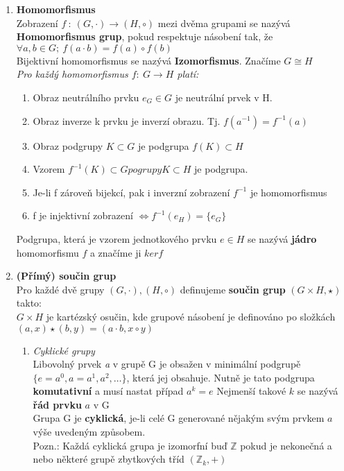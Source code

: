 \documentclass[12pt,a4paper]{article}
\begin{document}
\begin{enumerate}
		\item \textbf{Homomorfismus}\\
		Zobrazení 	$f~:~(G,\cdot) \rightarrow (H,\circ)$ mezi dvěma grupami se nazývá  \textbf{Homomorfismus grup}, pokud respektuje násobení tak, že $\forall a,b \in G;~ f(a\cdot b) = f(a) \circ f(b)$ \\Bijektivní homomorfismus se nazývá \textbf{Izomorfismus}. Značíme $G \cong H$ \\ \textit{Pro každý homomorfismus $f:~G \rightarrow H$ platí:}
		\begin{enumerate}
			\item Obraz neutrálního prvku $e_G \in G$ je neutrální prvek v H.
			\item Obraz inverze k prvku je inverzí obrazu. Tj. $f(a^{-1}) = f^{-1}(a)$
			\item Obraz podgrupy $K \subset G$ je podgrupa $f(K) \subset H$
			\item Vzorem $f^{-1}(K) \subset G pogrupy K \subset H$ je podgrupa.
			\item Je-li f zároveň bijekcí, pak i inverzní zobrazení $f^{-1}$ je homomorfismus
			\item f je injektivní zobrazení $\Leftrightarrow f^{-1}(e_H)= \{e_G\}$
		\end{enumerate}
		Podgrupa, která je vzorem jednotkového prvku $e \in H$ se nazývá \textbf{jádro} homomorfismu $f$ a značíme ji $ker f$
		
		\item \textbf{(Přímý) součin grup}\\
		Pro každé dvě grupy $(G,\cdot), (H,\circ)$ definujeme \textbf{součin grup} $(G \times H, \star)$ takto:\\ $G \times H$ je kartézský osučin, kde grupové násobení je definováno po složkách
		$(a,x) \star (b,y) = (a \cdot b, x \circ y)$
		\begin{enumerate}
			\item \textit{Cyklické grupy} \\
			Libovolný prvek \textit{a} v grupě  G je obsažen v minimální podgrupě\\ $\{e = a^0, a = a^1, a^2, \dots\}$, která jej obsahuje. Nutně je tato podgrupa \textbf{komutativní} a musí nastat případ $a^k = e$
			Nejmenší takové $k$ se nazývá \textbf{řád prvku} $a$ v G\\ Grupa G je \textbf{cyklická}, je-li celé G generované nějakým svým prvkem $a$ výše uvedeným způsobem.\\ 
			Pozn.: Každá cyklická grupa je izomorfní buď $\mathbb{Z}$ pokud je nekonečná a nebo některé grupě zbytkových tříd $(\mathbb{Z}_k,+)$
		\end{enumerate}
		

\end{enumerate}
\end{document}
